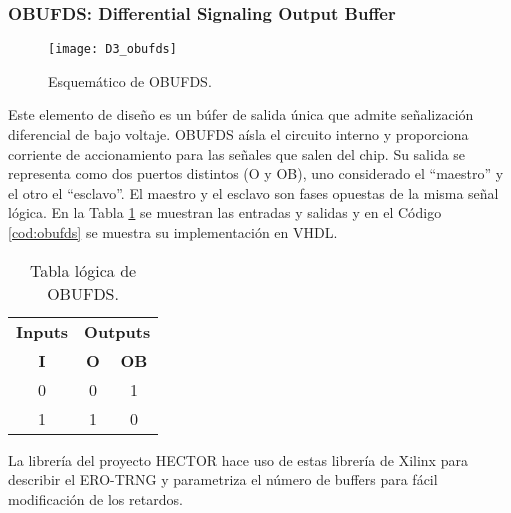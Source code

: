                \vspace{0.4cm}
                

            \subsubsection{OBUFDS: Differential Signaling Output Buffer}

                \begin{figure}[hbtp]
                    \centering
                    \texttt{[image: D3\_obufds]}
                    \caption{Esquemático de OBUFDS.}
                    \label{fig:D3_obufds}
                \end{figure}	

                Este elemento de diseño es un búfer de salida única que admite señalización diferencial de bajo voltaje. OBUFDS aísla el circuito interno y proporciona corriente de accionamiento para las señales que salen del chip. Su salida se representa como dos puertos distintos (O y OB), uno considerado el ``maestro'' y el otro el ``esclavo''. El maestro y el esclavo son fases opuestas de la misma señal lógica.  En la Tabla \ref{tab:obufds} se muestran las entradas y salidas y en el Código \ref{cod:obufds} se muestra su implementación en VHDL.
                
                \begin{table}[htbp]
                    \centering
                    \caption{Tabla lógica de OBUFDS.}
                    \begin{tabular}{|c|cc|}
                        \hline
                        \textbf{Inputs} & \multicolumn{2}{c|}{\textbf{Outputs}} \\ 
                        \textbf{I}      & \multicolumn{1}{c}{\textbf{O}}  & \textbf{OB} \\ 
                        \hline
                        0      & \multicolumn{1}{c|}{0}  & 1  \\ \hline
                        1      & \multicolumn{1}{c|}{1}  & 0  \\ \hline
                    \end{tabular}
                    \label{tab:obufds}
                \end{table}

                \vspace{0.4cm}
                

                La librería del proyecto HECTOR \cite{Laban2016} hace uso de estas librería de Xilinx para describir el ERO-TRNG y parametriza el número de buffers para fácil modificación de los retardos.


